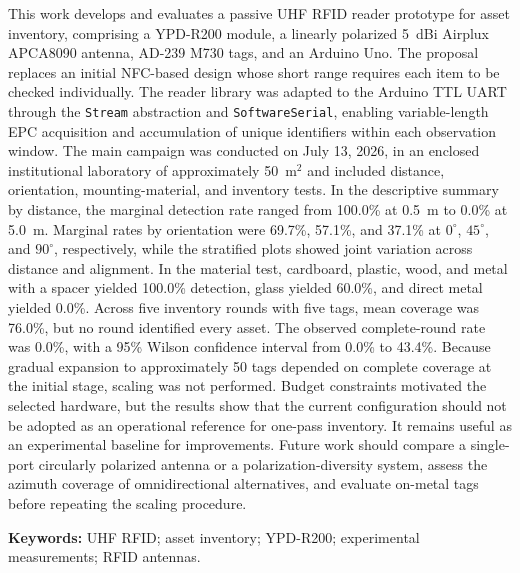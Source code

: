 %
%

\begin{resumo}[Abstract]

This work develops and evaluates a passive UHF RFID reader prototype for asset inventory, comprising a YPD-R200 module, a linearly polarized 5~dBi Airplux APCA8090 antenna, AD-239 M730 tags, and an Arduino Uno. The proposal replaces an initial NFC-based design whose short range requires each item to be checked individually. The reader library was adapted to the Arduino TTL UART through the \texttt{Stream} abstraction and \texttt{SoftwareSerial}, enabling variable-length EPC acquisition and accumulation of unique identifiers within each observation window. The main campaign was conducted on July 13, 2026, in an enclosed institutional laboratory of approximately 50~m$^2$ and included distance, orientation, mounting-material, and inventory tests. In the descriptive summary by distance, the marginal detection rate ranged from 100.0\% at 0.5~m to 0.0\% at 5.0~m. Marginal rates by orientation were 69.7\%, 57.1\%, and 37.1\% at $0^\circ$, $45^\circ$, and $90^\circ$, respectively, while the stratified plots showed joint variation across distance and alignment. In the material test, cardboard, plastic, wood, and metal with a spacer yielded 100.0\% detection, glass yielded 60.0\%, and direct metal yielded 0.0\%. Across five inventory rounds with five tags, mean coverage was 76.0\%, but no round identified every asset. The observed complete-round rate was 0.0\%, with a 95\% Wilson confidence interval from 0.0\% to 43.4\%. Because gradual expansion to approximately 50 tags depended on complete coverage at the initial stage, scaling was not performed. Budget constraints motivated the selected hardware, but the results show that the current configuration should not be adopted as an operational reference for one-pass inventory. It remains useful as an experimental baseline for improvements. Future work should compare a single-port circularly polarized antenna or a polarization-diversity system, assess the azimuth coverage of omnidirectional alternatives, and evaluate on-metal tags before repeating the scaling procedure.

\textbf{Keywords:} UHF RFID; asset inventory; YPD-R200; experimental measurements; RFID antennas.

\end{resumo}

